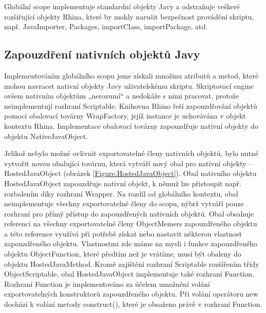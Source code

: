 Globální scope implementuje standardní objekty Javy a odstraňuje veškeré rozšiřující objekty Rhina, které by mohly narušit bezpečnost provádění skriptu, např. JavaImporter, Packages, importClass, importPackage, atd.

\subsection{Zapouzdření nativních objektů Javy}
\label{Chapter.Implementation.NativeJavaWrappers}

Implementováním globálního scopu jsme získali množinu atributů a metod, které mohou navracet nativní objekty Javy uživatelskému skriptu. Skriptovací engine ovšem nativním objektům „nerozumí“ a nedokáže s nimi pracovat, protože neimplementují rozhraní Scriptable. Knihovna Rhino řeší zapouzdřování objektů pomocí obalovací továrny WrapFactory, jejíž instance je uchovávána v objekt kontextu Rhina. Implementace obalovací továrny zapouzdřuje nativní objekty do objektu NativeJavaObject.

Jelikož nebylo možné ovlivnit exportovatelné členy nativních objektů, bylo nutné vytvořit novou obalující továrnu, která vytváří nový obal pro nativní objekty -- HostedJavaObject (obrázek \ref{Figure.HostedJavaObject}). Obal nativního objektu HostedJavaObject zapouzdřuje nativní objekt, k němuž lze přistoupit např. rozbalením díky rozhraní Wrapper. Na rozdíl od globálního kontextu, obal neimplementuje všechny exportovatelné členy do scopu, nýbrž vytváří pouze rozhraní pro přímý přístup do zapouzdřených nativních objektů. Obal obsahuje referenci na všechny exportovatelné členy ObjectMemers zapouzdřeného objektu a této reference využívá při potřebě získat nebo nastavit některou vlastnost zapouzdřeného objektu. Vlastnostmi zde máme na mysli i funkce zapouzdřeného objektu ObjectFunction, které předtím než je vrátíme, musí být obaleny do objektu HostedJavaMethod. Kromě zajištění rozhraní Scriptable rozšířením třídy ObjectScriptable, obal HostedJavaObject implementuje také rozhraní Function. Rozhraní Function je implementováno za účelem umožnění volání exportovatelných konstruktorů zapouzdřeného objektu. Při volání operátoru new dochází k volání metody construct(), které je obsaženo právě v rozhraní Function.


